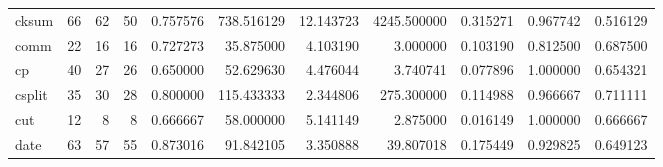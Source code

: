 \begin{longtable}{lrrrrrrrrrr}
cksum     &                                      66 &                 62 &                                50 &                                   0.757576 &                             738.516129 &                                    12.143723 &                       4245.500000 &                                0.315271 &                           0.967742 &                                           0.516129 \\
comm      &                                      22 &                 16 &                                16 &                                   0.727273 &                              35.875000 &                                     4.103190 &                          3.000000 &                                0.103190 &                           0.812500 &                                           0.687500 \\
cp        &                                      40 &                 27 &                                26 &                                   0.650000 &                              52.629630 &                                     4.476044 &                          3.740741 &                                0.077896 &                           1.000000 &                                           0.654321 \\
csplit    &                                      35 &                 30 &                                28 &                                   0.800000 &                             115.433333 &                                     2.344806 &                        275.300000 &                                0.114988 &                           0.966667 &                                           0.711111 \\
cut       &                                      12 &                  8 &                                 8 &                                   0.666667 &                              58.000000 &                                     5.141149 &                          2.875000 &                                0.016149 &                           1.000000 &                                           0.666667 \\
date      &                                      63 &                 57 &                                55 &                                   0.873016 &                              91.842105 &                                     3.350888 &                         39.807018 &                                0.175449 &                           0.929825 &                                           0.649123 \\

\end{longtable}
